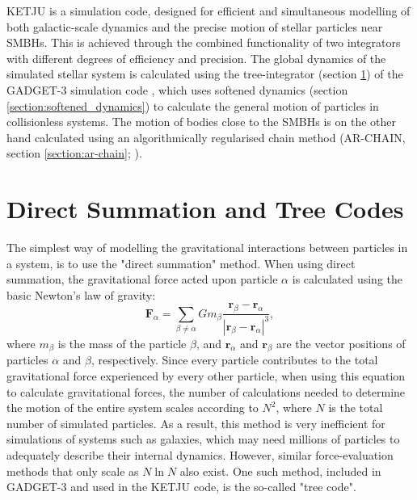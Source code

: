 \documentclass[english, twoside]{HYgradu}
\begin{document}
KETJU \citep{Rantala2017KETJU} is a simulation code, designed for efficient and simultaneous modelling of both galactic-scale dynamics and the precise motion of stellar particles near SMBHs. This is achieved through the combined functionality of two integrators with different degrees of efficiency and precision. The global dynamics of the simulated stellar system is calculated using the tree-integrator (section \ref{section:tree}) of the GADGET-3 simulation code \citep{Springel2005}, which uses softened dynamics (section \ref{section:softened_dynamics}) to calculate the general motion of particles in collisionless systems. The motion of bodies close to the SMBHs is on the other hand calculated using an algorithmically regularised chain method (AR-CHAIN, section \ref{section:ar-chain}; \citealt{Mikkola2008ARCHAIN}).

\section{Direct Summation and Tree Codes} \label{section:tree}

The simplest way of modelling the gravitational interactions between particles in a system, is to use the "direct summation" method. When using direct summation, the gravitational force acted upon particle $\alpha$ is calculated using the basic Newton's law of gravity:
\begin{equation}
\mathbf{F}_\alpha = \displaystyle\sum_{\beta \neq \alpha} Gm_\beta \frac{\mathbf{r}_\beta-\mathbf{r}_\alpha}{|\mathbf{r}_\beta-\mathbf{r}_\alpha|^3}, \label{eq:f_alpha}
\end{equation}
where $m_\beta$ is the mass of the particle $\beta$, and $\mathbf{r}_\alpha$ and $\mathbf{r}_\beta$ are the vector positions of particles $\alpha$ and $\beta$, respectively. Since every particle contributes to the total gravitational force experienced by every other particle, when using this equation to calculate gravitational forces, the number of calculations needed to determine the motion of the entire system scales according to $N^2$, where $N$ is the total number of simulated particles. As a result, this method is very inefficient for simulations of systems such as galaxies, which may need millions of particles to adequately describe their internal dynamics. However, similar force-evaluation methods that only scale as $N\ln N$ also exist. One such method, included in GADGET-3 and used in the KETJU code, is the so-called "tree code".
\end{document}
